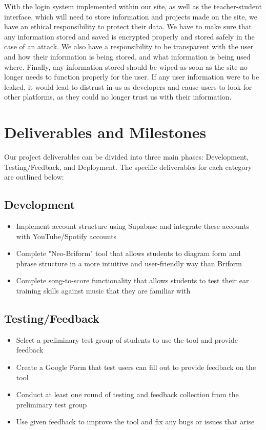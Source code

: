 \documentclass[12pt, letterpaper]{article}
\begin{document}
With the login system implemented within our site, as well as the teacher-student interface, which will need to store information and projects made on the site, we have an ethical responsibility to protect their data. We have to make sure that any information stored and saved is encrypted properly and stored safely in the case of an attack. We also have a responsibility to be transparent with the user and how their information is being stored, and what information is being used where. Finally, any information stored should be wiped as soon as the site no longer needs to function properly for the user. If any user information were to be leaked, it would lead to distrust in us as developers and cause users to look for other platforms, as they could no longer trust us with their information.

\section*{Deliverables and Milestones}
Our project deliverables can be divided into three main phases: Development, Testing/Feedback, and Deployment.  The specific deliverables for each category are outlined below:

\subsection*{Development}
\begin{itemize}
    \item[--] Implement account structure using Supabase and integrate these accounts with YouTube/Spotify accounts
    \item[--] Complete "Neo-Briform" tool that allows students to diagram form and phrase structure in a more intuitive and user-friendly way than Briform
    \item[--] Complete song-to-score functionality that allows students to test their ear training skills against music that they are familiar with
\end{itemize}

\subsection*{Testing/Feedback}
\begin{itemize}
    \item[--] Select a preliminary test group of students to use the tool and provide feedback
    \item[--] Create a Google Form that test users can fill out to provide feedback on the tool
    \item[--] Conduct at least one round of testing and feedback collection from the preliminary test group
    \item[--] Use given feedback to improve the tool and fix any bugs or issues that arise
\end{itemize}
\end{document}

